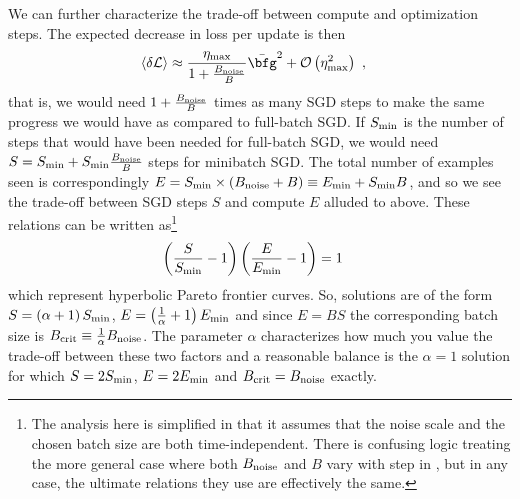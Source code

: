 \documentclass[11pt]{article}
\begin{document}
We can further characterize the trade-off between compute and optimization steps. The expected
decrease in loss per update is then
\begin{align}
	\langle \delta \Lcal \rangle & \approx \frac{ \eta _{ {\rm  max} } }{ 1 + \frac{ B _{ {\rm  noise} } }{ B } } \bar{\bfg } ^{2 } + \Ocal \left( \eta _{ {\rm max} } ^{ 2 } \right) \ ,
\end{align}
that is, we would need $ 1 + \frac{ B _{ {\rm noise} } }{ B } $ times as many SGD steps to make the
same progress we would have as compared to full-batch SGD. If $ S _{ {\rm  min} } $ is the number of
steps that would have been needed for full-batch SGD, we would need $ S=S _{ {\rm  min} } + S _{
			{\rm  min} } \frac{ B _{ {\rm noise} } }{ B } $ steps for minibatch SGD.  The total number of
examples seen is correspondingly $ E = S _{ {\rm  min} } \times  \left ( B _{ {\rm  noise} } +B
	\right)\equiv E _{ {\rm min} }+ S _{ {\rm  min} }B $, and so we see the trade-off between SGD steps
$ S $ and compute $ E $ alluded to above.  These relations can be written as\footnote{The analysis
	here is simplified in that it assumes that the noise scale and the chosen batch size are both
	time-independent. There is confusing logic treating the more general case where both
	$ B _{ {\rm noise} } $ and $ B $ vary with step in \cite{mccandlish2018empirical}, but in any case,
	the ultimate relations they use are effectively the same.}
\begin{align}
	\left ( \frac{ S }{ S _{ {\rm  min} } }-1 \right )\left ( \frac{ E }{ E _{ {\rm min} } }-1 \right ) & =1
\end{align}
which represent hyperbolic Pareto frontier curves. So, solutions are of the form $ S=\left ( \alpha
	+1 \right )S _{ {\rm  min} } $, $ E=\left ( \frac{ 1 }{ \alpha  } +1 \right )E _{ {\rm  min} } $
and since $E=BS $ the corresponding batch size is $ B _{ {\rm crit} } \equiv  \frac{ 1 }{ \alpha  }
	B _{ {\rm noise} }$. The parameter $ \alpha $ characterizes how much you value the trade-off between
these two factors and a reasonable balance is the $ \alpha =1 $ solution for which $S = 2S _{ {\rm
					min} } $, $ E=2E _{ {\rm min} } $ and $ B _{ {\rm crit} }= B _{ {\rm  noise} } $ exactly.
\end{document}
